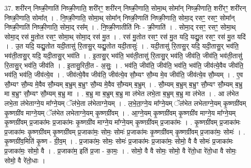 \documentclass[17pt]{extarticle}
\begin{document}
37. शरी॑रन् निष्क्री॒णाति॑ निष्क्री॒णाति॒ शरी॑रꣳ॒॒ शरी॑रन् निष्क्री॒णाति॒ सोमा॒थ् सोमा᳚न् निष्क्री॒णाति॒ शरी॑रꣳ॒॒ शरी॑रन् निष्क्री॒णाति॒ सोमा᳚त् । . नि॒ष्क्री॒णाति॒ सोमा॒थ् सोमा᳚न् निष्क्री॒णाति॑ निष्क्री॒णाति॒ सोमा॒द् रसꣳ॒॒ रसꣳ॒॒ सोमा᳚न् निष्क्री॒णाति॑ निष्क्री॒णाति॒ सोमा॒द् रस᳚म् । . नि॒ष्क्री॒णातीति॑ निः - क्री॒णाति॑ । . सोमा॒द् रसꣳ॒॒ रसꣳ॒॒ सोमा॒थ् सोमा॒द् रस॑ मु॒तोत रसꣳ॒॒ सोमा॒थ् सोमा॒द् रस॑ मु॒त । . रस॑ मु॒तोत रसꣳ॒॒ रस॑ मु॒त यदि॒ यद्यु॒त रसꣳ॒॒ रस॑ मु॒त यदि॑ । . उ॒त यदि॒ यद्यु॒तोत यदी॒तासु॑ रि॒तासु॒र् यद्यु॒तोत यदी॒तासुः॑ । . यदी॒तासु॑ रि॒तासु॒र् यदि॒ यदी॒तासु॒र् भव॑ति॒ भव॑ती॒तासु॒र् यदि॒ यदी॒तासु॒र् भव॑ति । . इ॒तासु॒र् भव॑ति॒ भव॑ती॒तासु॑ रि॒तासु॒र् भव॑ति॒ जीव॑ति॒ जीव॑ति॒ भव॑ती॒तासु॑ रि॒तासु॒र् भव॑ति॒ जीव॑ति । . इ॒तासु॒रिती॒त - अ॒सुः॒ । . भव॑ति॒ जीव॑ति॒ जीव॑ति॒ भव॑ति॒ भव॑ति॒ जीव॑त्ये॒वैव जीव॑ति॒ भव॑ति॒ भव॑ति॒ जीव॑त्ये॒व । . जीव॑त्ये॒वैव जीव॑ति॒ जीव॑त्ये॒व सौ॒म्यꣳ सौ॒म्य मे॒व जीव॑ति॒ जीव॑त्ये॒व सौ॒म्यम् । . ए॒व सौ॒म्यꣳ सौ॒म्य मे॒वैव सौ॒म्यम् ब॒भ्रुम् ब॒भ्रुꣳ सौ॒म्य मे॒वैव सौ॒म्यम् ब॒भ्रुम् । . सौ॒म्यम् ब॒भ्रुम् ब॒भ्रुꣳ सौ॒म्यꣳ सौ॒म्यम् ब॒भ्रु मा ब॒भ्रुꣳ सौ॒म्यꣳ सौ॒म्यम् ब॒भ्रु मा । . ब॒भ्रु मा ब॒भ्रुम् ब॒भ्रु मा ल॑भेत लभे॒ता ब॒भ्रुम् ब॒भ्रु मा ल॑भेत । . आ ल॑भेत लभे॒ता ल॑भेताग्ने॒य मा᳚ग्ने॒यम् ॅल॑भे॒ता ल॑भेताग्ने॒यम् । . ल॒भे॒ता॒ग्ने॒य मा᳚ग्ने॒यम् ॅल॑भेत लभेताग्ने॒यम् कृ॒ष्णग्री॑वम् कृ॒ष्णग्री॑व माग्ने॒यम् ॅल॑भेत लभेताग्ने॒यम् कृ॒ष्णग्री॑वम् । . आ॒ग्ने॒यम् कृ॒ष्णग्री॑वम् कृ॒ष्णग्री॑व माग्ने॒य मा᳚ग्ने॒यम् कृ॒ष्णग्री॑वम् प्र॒जाका॑मः प्र॒जाका॑मः कृ॒ष्णग्री॑व माग्ने॒य मा᳚ग्ने॒यम् कृ॒ष्णग्री॑वम् प्र॒जाका॑मः । . कृ॒ष्णग्री॑वम् प्र॒जाका॑मः प्र॒जाका॑मः कृ॒ष्णग्री॑वम् कृ॒ष्णग्री॑वम् प्र॒जाका॑मः॒ सोमः॒ सोमः॑ प्र॒जाका॑मः कृ॒ष्णग्री॑वम् कृ॒ष्णग्री॑वम् प्र॒जाका॑मः॒ सोमः॑ । . कृ॒ष्णग्री॑व॒मिति॑ कृ॒ष्ण - ग्री॒व॒म् । . प्र॒जाका॑मः॒ सोमः॒ सोमः॑ प्र॒जाका॑मः प्र॒जाका॑मः॒ सोमो॒ वै वै सोमः॑ प्र॒जाका॑मः प्र॒जाका॑मः॒ सोमो॒ वै । . प्र॒जाका॑म॒ इति॑ प्र॒जा - का॒मः॒ । . सोमो॒ वै वै सोमः॒ सोमो॒ वै रे॑तो॒धा रे॑तो॒धा वै सोमः॒ सोमो॒ वै रे॑तो॒धाः । \newline
\pagebreak
{}
\end{document}
